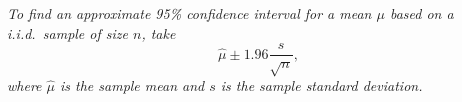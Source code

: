 \documentclass{article}
\begin{document}
\begin{enumerate}
\begin{enumerate}
    \vspace{1ex}
    {\em To find an approximate 95\% confidence interval for a mean $\mu$ based
    on a i.i.d.~sample of size $n$, take
    \[
    \hat\mu \pm 1.96 \frac{s}{\sqrt{n}},
    \]
    where $\hat\mu$ is the sample mean and $s$ is the sample standard deviation.
    }
    \end{enumerate}
  

\end{enumerate}
\end{document}
